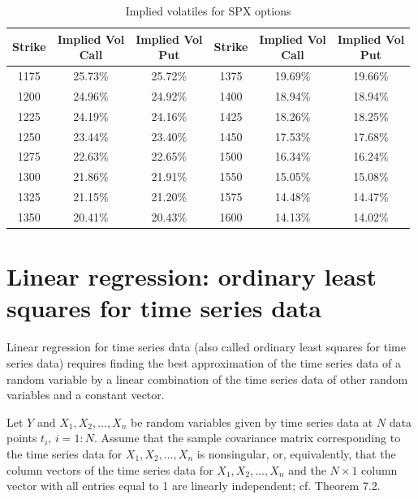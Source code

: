 
\begin{table}[H]
\centering
\caption{Implied volatiles for SPX options}
\begin{tabular}{|c|c|c||c|c|c|}
\hline
Strike & \shortstack{Implied Vol\\Call} & \shortstack{Implied Vol\\Put} & Strike &
\shortstack{Implied Vol\\Call} & \shortstack{Implied Vol\\Put} \\
\hline
1175 & 25.73\% & 25.72\% & 1375 & 19.69\% & 19.66\% \\
\hline
1200 & 24.96\% & 24.92\% & 1400 & 18.94\% & 18.94\% \\
\hline
1225 & 24.19\% & 24.16\% & 1425 & 18.26\% & 18.25\% \\
\hline
1250 & 23.44\% & 23.40\% & 1450 & 17.53\% & 17.68\% \\
\hline
1275 & 22.63\% & 22.65\% & 1500 & 16.34\% & 16.24\% \\
\hline
1300 & 21.86\% & 21.91\% & 1550 & 15.05\% & 15.08\% \\
\hline
1325 & 21.15\% & 21.20\% & 1575 & 14.48\% & 14.47\% \\
\hline
1350 & 20.41\% & 20.43\% & 1600 & 14.13\% & 14.02\% \\
\hline
\end{tabular}
\end{table}

\section{Linear regression: ordinary least squares for time series data}

Linear regression for time series data (also called ordinary least squares for time
series data) requires finding the best approximation of the time series data of a
random variable by a linear combination of the time series data of other random
variables and a constant vector.

Let $Y$ and $X_1, X_2, \ldots, X_n$ be random variables given by time series data at
$N$ data points $t_i$, $i = 1:N$. Assume that the sample covariance matrix
corresponding to the time series data for $X_1, X_2, \ldots, X_n$ is nonsingular, or,
equivalently, that the column vectors of the time series data for $X_1, X_2, \ldots,
X_n$ and the $N \times 1$ column vector with all entries equal to 1 are linearly
independent; cf. Theorem 7.2.

